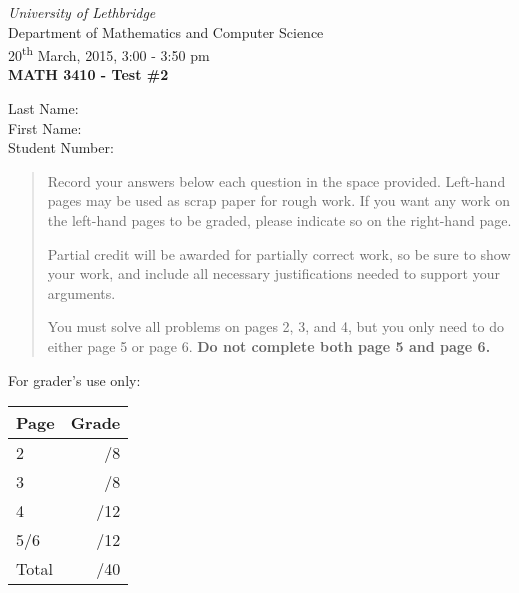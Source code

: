 \documentclass[12pt]{article}
\newcommand{\skipline}{\vspace{12pt}}
\begin{document}
\author{Instructor: Sean Fitzpatrick}
\thispagestyle{plain}
\begin{center}
\emph{University of Lethbridge}\\
Department of Mathematics and Computer Science\\
20\textsuperscript{th} March, 2015, 3:00 - 3:50 pm\\
{\bf MATH 3410 - Test \#2}\\
\end{center}
\skipline \skipline \skipline \noindent \skipline
Last Name:\underline{\hspace{353pt}}\\
\skipline
First Name:\underline{\hspace{350pt}}\\
\skipline
Student Number:\underline{\hspace{323pt}}\\
\skipline



\vspace{0.5in}


\begin{quote}
 {Record your answers below each question in the space provided.    Left-hand pages may be used as scrap paper for rough work.  If you want any work on the left-hand pages to be graded, please indicate so on the right-hand page.
 
 \bigskip
 
Partial credit will be awarded for partially correct work, so be sure to show your work, and include all necessary justifications needed to support your arguments.}

 \bigskip

You must solve all problems on pages 2, 3, and 4, but you only need to do either page 5 or page 6. {\bf Do not complete both page 5 and page 6.}
\end{quote}


\vspace{0.5in}

For grader's use only:

\begin{table}[hbt]
\begin{center}
\begin{tabular}{|l|r|} \hline
Page&Grade\\
\hline \hline
\cline{1-2} 2 & \enspace\enspace\enspace\enspace\enspace\enspace/8\\
\cline{1-2} 3 & \enspace\enspace\enspace\enspace\enspace\enspace/8\\
\cline{1-2} 4 & \enspace\enspace\enspace\enspace\enspace\enspace/12\\
\cline{1-2} 5/6 & \enspace\enspace\enspace\enspace\enspace\enspace/12\\
\cline{1-2} Total & \enspace\enspace\enspace\enspace\enspace\enspace/40\\
\hline
\end{tabular}




\end{center}
\end{table}
\newpage
\end{document}
